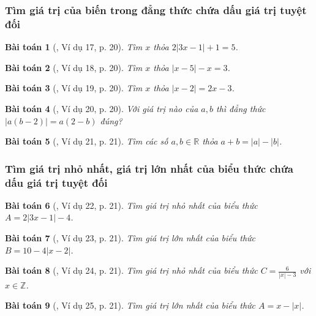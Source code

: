 \documentclass{article}
\newtheorem{baitoan}{Bài toán}
\begin{document}
\subsubsection{Tìm giá trị của biến trong đẳng thức chứa dấu giá trị tuyệt đối}

\begin{baitoan}[\cite{Binh_Toan_7_tap_1}, Ví dụ 17, p. 20]
	Tìm $x$ thỏa $2|3x - 1| + 1 = 5$.
\end{baitoan}

\begin{baitoan}[\cite{Binh_Toan_7_tap_1}, Ví dụ 18, p. 20]
	Tìm $x$ thỏa $|x - 5| - x = 3$.
\end{baitoan}

\begin{baitoan}[\cite{Binh_Toan_7_tap_1}, Ví dụ 19, p. 20]
	Tìm $x$ thỏa $|x - 2| = 2x - 3$.
\end{baitoan}

\begin{baitoan}[\cite{Binh_Toan_7_tap_1}, Ví dụ 20, p. 20]
	Với giá trị nào của $a,b$ thì đẳng thức $|a(b - 2)| = a(2 - b)$ đúng?
\end{baitoan}

\begin{baitoan}[\cite{Binh_Toan_7_tap_1}, Ví dụ 21, p. 21]
	Tìm các số $a,b\in\mathbb{R}$ thỏa $a + b = |a| - |b|$.
\end{baitoan}

\subsubsection{Tìm giá trị nhỏ nhất, giá trị lớn nhất của biểu thức chứa dấu giá trị tuyệt đối}

\begin{baitoan}[\cite{Binh_Toan_7_tap_1}, Ví dụ 22, p. 21]
	Tìm giá trị nhỏ nhất của biểu thức $A = 2|3x - 1| - 4$.
\end{baitoan}

\begin{baitoan}[\cite{Binh_Toan_7_tap_1}, Ví dụ 23, p. 21]
	Tìm giá trị lớn nhất của biểu thức $B = 10 - 4|x - 2|$.
\end{baitoan}

\begin{baitoan}[\cite{Binh_Toan_7_tap_1}, Ví dụ 24, p. 21]
	Tìm giá trị nhỏ nhất của biểu thức $C = \frac{6}{|x| - 3}$ với $x\in\mathbb{Z}$.
\end{baitoan}

\begin{baitoan}[\cite{Binh_Toan_7_tap_1}, Ví dụ 25, p. 21]
	Tìm giá trị lớn nhất của biểu thức $A = x - |x|$.
\end{baitoan}
\end{document}
